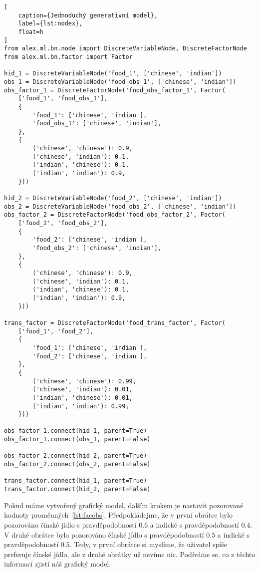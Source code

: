 \begin{lstlisting}[
	caption={Jednoduchý generativní model},
	label={lst:nodex},
	float=h
]
from alex.ml.bn.node import DiscreteVariableNode, DiscreteFactorNode
from alex.ml.bn.factor import Factor

hid_1 = DiscreteVariableNode('food_1', ['chinese', 'indian'])
obs_1 = DiscreteVariableNode('food_obs_1', ['chinese', 'indian'])
obs_factor_1 = DiscreteFactorNode('food_obs_factor_1', Factor(
    ['food_1', 'food_obs_1'],
    {
        'food_1': ['chinese', 'indian'],
        'food_obs_1': ['chinese', 'indian'],
    },
    {
        ('chinese', 'chinese'): 0.9,
        ('chinese', 'indian'): 0.1,
        ('indian', 'chinese'): 0.1,
        ('indian', 'indian'): 0.9,
    }))

hid_2 = DiscreteVariableNode('food_2', ['chinese', 'indian'])
obs_2 = DiscreteVariableNode('food_obs_2', ['chinese', 'indian'])
obs_factor_2 = DiscreteFactorNode('food_obs_factor_2', Factor(
    ['food_2', 'food_obs_2'],
    {
        'food_2': ['chinese', 'indian'],
        'food_obs_2': ['chinese', 'indian'],
    },
    {
        ('chinese', 'chinese'): 0.9,
        ('chinese', 'indian'): 0.1,
        ('indian', 'chinese'): 0.1,
        ('indian', 'indian'): 0.9,
    }))

trans_factor = DiscreteFactorNode('food_trans_factor', Factor(
    ['food_1', 'food_2'],
    {
        'food_1': ['chinese', 'indian'],
        'food_2': ['chinese', 'indian'],
    },
    {
        ('chinese', 'chinese'): 0.99,
        ('chinese', 'indian'): 0.01,
        ('indian', 'chinese'): 0.01,
        ('indian', 'indian'): 0.99,
    }))

obs_factor_1.connect(hid_1, parent=True)
obs_factor_1.connect(obs_1, parent=False)

obs_factor_2.connect(hid_2, parent=True)
obs_factor_2.connect(obs_2, parent=False)

trans_factor.connect(hid_1, parent=True)
trans_factor.connect(hid_2, parent=False)
\end{lstlisting}

Pokud máme vytvořený grafický model, dalším krokem je nastavit pozorované hodnoty proměnných~\ref{lst:facobs}.
Předpokládejme, že v první obrátce bylo pozorováno čínské jídlo s pravděpodobností $0.6$ a indické s pravděpodobností $0.4$.
V druhé obrátce bylo pozorováno čínské jídlo s pravděpodobností $0.5$ a indické s pravděpodobností $0.5$.
Tedy, v první obrátce si myslíme, že uživatel spíše preferuje čínské jídlo, ale z druhé obrátky už nevíme nic. 
Podíváme se, co z těchto informací zjistí náš grafický model.


